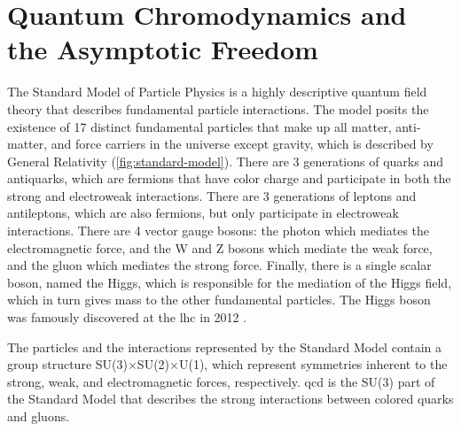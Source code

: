 


\section{Quantum Chromodynamics and the Asymptotic Freedom}
\label{sec:qcd}

The Standard Model of Particle Physics is a highly descriptive quantum field theory that describes fundamental particle interactions.
The model posits the existence of 17 distinct fundamental particles that make up all matter, anti-matter, and force carriers in the universe except gravity, which is described by General Relativity (\ref{fig:standard-model}).
There are 3 generations of quarks and antiquarks, which are fermions that have color charge and participate in both the strong and electroweak interactions.
There are 3 generations of leptons and antileptons, which are also fermions, but only participate in electroweak interactions.
There are 4 vector gauge bosons: the photon which mediates the electromagnetic force, and the W and Z bosons which mediate the weak force, and the gluon which mediates the strong force.
Finally, there is a single scalar boson, named the Higgs, which is responsible for the mediation of the Higgs field, which in turn gives mass to the other fundamental particles.
The Higgs boson was famously discovered at the \gls{lhc} in 2012 \cite{201230}.

The particles and the interactions represented by the Standard Model contain a group structure SU(3)$\times$SU(2)$\times$U(1), which represent symmetries inherent to the strong, weak, and electromagnetic forces, respectively.
\gls{qcd} is the SU(3) part of the Standard Model that describes the strong interactions between colored quarks and gluons.  




